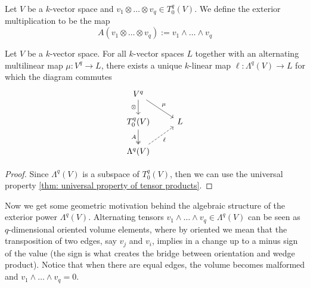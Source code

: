 \begin{definition}
  \label{def: exterior multiplication}
  Let \(V\) be a \(k\)-vector space and \(v_1 \otimes \dots \otimes v_q \in
  T_0^q(V)\). We define the exterior multiplication to be the map
  \[
    A(v_1 \otimes \dots \otimes v_q) := v_1 \wedge \dots \wedge v_q
  \]
\end{definition}

\begin{proposition}
  \label{prop: exterior power universal property}
  Let \(V\) be a \(k\)-vector space. For all \(k\)-vector spaces \(L\) together
  with an alternating multilinear map \(\mu: V^q \to L\), there exists a unique
  \(k\)-linear map \(\ell: \Lambda^q(V) \to L\) for which the diagram commutes
  \[
    \begin{tikzcd}
      V^q \ar[d, swap, "\otimes"] \ar[dr, "\mu"] \\
      T_0^q(V) \ar[d, swap, two heads, "A"] &L \\
      \Lambda^q(V) \ar[ur, dashed, swap, "\ell"]
    \end{tikzcd}
  \]
\end{proposition}

\begin{proof}
  Since \(\Lambda^q(V)\) is a subspace of \(T_0^q(V)\), then we can use the
  universal property \cref{thm: universal property of tensor products}.
\end{proof}

Now we get some geometric motivation behind the algebraic structure of the
exterior power \(\Lambda^q(V)\). Alternating tensors \(v_1 \wedge \dots \wedge
v_q \in \Lambda^q(V)\) can be seen as \(q\)-dimensional oriented volume elements,
where by oriented we mean that the transposition of two edges, say \(v_j\) and
\(v_i\), implies in a change up to a minus sign of the value (the sign is what
creates the bridge between orientation and wedge product). Notice that when
there are equal edges, the volume becomes malformed and \(v_1 \wedge \dots
\wedge v_q = 0\).

